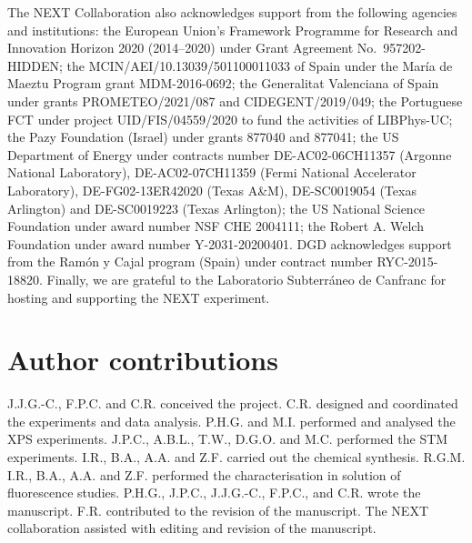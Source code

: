 \documentclass[aps,prl,reprint,longbibliography,superscriptaddress, english]{revtex4-1}
\begin{document}
The NEXT Collaboration also acknowledges support from the following agencies and institutions: the European Union's Framework Programme for Research and Innovation Horizon 2020 (2014--2020) under Grant Agreement No.\ 957202-HIDDEN; the MCIN/AEI/10.13039/501100011033 of Spain under the Mar\'ia de Maeztu Program grant MDM-2016-0692; the Generalitat Valenciana of Spain under grants PROMETEO/2021/087 and CIDEGENT/2019/049; the Portuguese FCT under project UID/FIS/04559/2020 to fund the activities of LIBPhys-UC; the Pazy Foundation (Israel) under grants 877040 and 877041; the US Department of Energy under contracts number DE-AC02-06CH11357 (Argonne National Laboratory), DE-AC02-07CH11359 (Fermi National Accelerator Laboratory), DE-FG02-13ER42020 (Texas A\&M), DE-SC0019054 (Texas Arlington) and DE-SC0019223 (Texas Arlington); the US National Science Foundation under award number NSF CHE 2004111; the Robert A. Welch Foundation under award number Y-2031-20200401. DGD acknowledges support from the Ram\'on y Cajal program (Spain) under contract number RYC-2015-18820. Finally, we are grateful to the Laboratorio Subterr\'aneo de Canfranc for hosting and supporting the NEXT experiment.


\section{Author contributions}
J.J.G.-C., F.P.C. and C.R. conceived the project. C.R. designed and coordinated the experiments and data analysis. P.H.G. and M.I. performed and analysed the XPS experiments. J.P.C., A.B.L., T.W., D.G.O. and M.C. performed the STM experiments. I.R., B.A., A.A. and Z.F. carried out the chemical synthesis. R.G.M. I.R., B.A., A.A. and Z.F. performed the characterisation in solution of fluorescence studies. P.H.G., J.P.C., J.J.G.-C., F.P.C., and C.R. wrote the manuscript. F.R. contributed to the revision of the manuscript. The NEXT collaboration assisted with editing and revision of the manuscript. 

%

 

\end{document}
